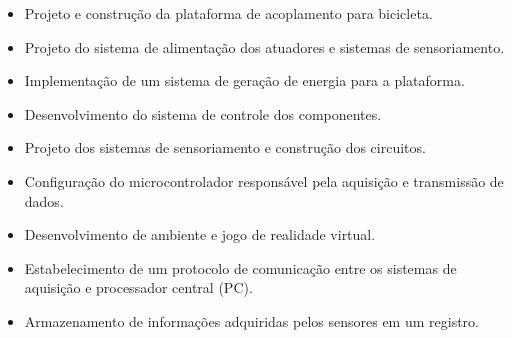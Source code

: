 \begin{itemize}
\item Projeto e construção da plataforma de acoplamento para bicicleta.

\item Projeto do sistema de alimentação dos atuadores e sistemas de sensoriamento.

\item Implementação de um sistema de geração de energia para a plataforma.

\item Desenvolvimento do sistema de controle dos componentes.

\item Projeto dos sistemas de sensoriamento e construção dos circuitos.

\item Configuração do microcontrolador responsável pela aquisição e transmissão de dados.

\item Desenvolvimento de ambiente e jogo de realidade virtual.

\item Estabelecimento de um protocolo de comunicação entre os sistemas de aquisição e processador central (PC).

\item Armazenamento de informações adquiridas pelos sensores em um registro.
\end{itemize}